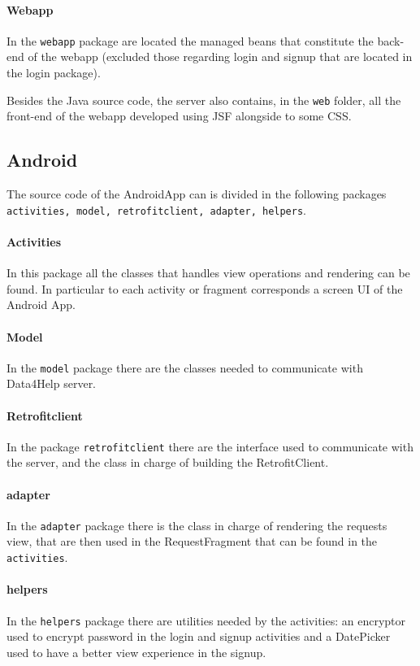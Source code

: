 \paragraph{Webapp}
In the \texttt{webapp} package are located the managed beans that constitute the back-end of the webapp (excluded those regarding login and signup that are located in the login package).

\vspace{1em}
\noindent
Besides the Java source code, the server also contains, in the \texttt{web} folder, all the front-end of the webapp developed using JSF alongside to some CSS.


\subsection{Android}

The source code of the AndroidApp can is divided in the following packages \texttt{activities, model, retrofitclient, adapter, helpers}.

\paragraph{Activities}
In this package all the classes that handles view operations and rendering can be found. In particular to each activity or fragment corresponds a screen UI of the Android App.

\paragraph{Model}
In the \texttt{model} package there are the classes needed to communicate with Data4Help server.

\paragraph{Retrofitclient}
In the package \texttt{retrofitclient} there are the interface used to communicate with the server, and the class in charge of building the RetrofitClient.

\paragraph{adapter}
In the \texttt{adapter} package there is the class in charge of rendering the requests view, that are then used in the RequestFragment that can be found in the \texttt{activities}.

\paragraph{helpers}
In the \texttt{helpers} package there are utilities needed by the activities: an encryptor used to encrypt password in the login and signup activities and a DatePicker used to have a better view experience in the signup.


